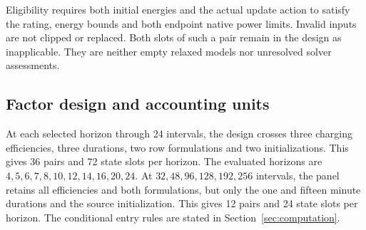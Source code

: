 Eligibility requires both initial energies and the actual update action to
satisfy the rating, energy bounds and both endpoint native power limits.
Invalid inputs are not clipped or replaced. Both slots of such a pair remain
in the design as inapplicable. They are neither empty relaxed models nor
unresolved solver assessments.

\subsection{Factor design and accounting units}
At each selected horizon through 24 intervals, the design crosses three
charging efficiencies, three durations, two row formulations and two
initializations. This gives 36 pairs and 72 state slots per horizon.
The evaluated horizons are $4,5,6,7,8,10,12,14,16,20,24$.
At $32,48,96,128,192,256$ intervals, the panel retains all efficiencies
and both formulations, but only the one and fifteen minute durations and
the source initialization. This gives 12 pairs and 24 state slots per horizon.
The conditional entry rules are stated in Section~\ref{sec:computation}.

